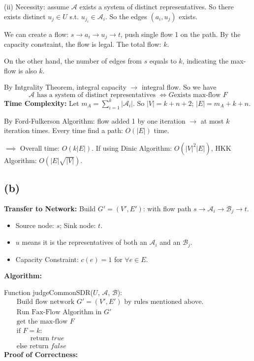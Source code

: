 \documentclass[11pt]{article}
\begin{document}
(ii) Necessity: assume $\mathcal{A}$ exists a system of distinct representatives. So there exists distinct $u_j \in U$ s.t. $u_{j_i} \in \mathcal{A}_i$. 
So the edges $(a_i, u_j)$ exists. 

We can create a flow: $s \to a_i \to u_j \to t$, push single flow 1 on the path. 
By the capacity constraint, the flow is legal. The total flow: $k$.

On the other hand, the number of edges from $s$ equals to $k$, indicating the max-flow is also $k$.

By Intgrality Theorem, integral capacity $\to$ integral flow. So we have 
\[\mathcal{A} \text{ has a system of distinct representatives } \iff G \text{exists max-flow }F \]
\textbf{Time Complexity: }
Let $m_A = \sum_{i=1}^{k} |\mathcal{A}_i|$. So $|V| = k + n + 2$; $|E| = m_A + k + n$. 

By Ford-Fulkerson Algorithm: flow added 1 by one iteration $\to$ at most $k$ iteration times.
Every time find a path: $O(|E|)$ time. 

$\implies$ Overall time: $O(k|E|)$. 
If using Dinic Algorithm: $O(|V|^2 |E|)$, HKK Algorithm: $O(|E|\sqrt{|V|})$. 

\subsection*{(b)}
\textbf{Transfer to Network: }Build $G' = (V', E')$: with flow path $s \to \mathcal{A}_i \to \mathcal{B}_j \to t$. 
\begin{itemize}
    \item Source node: $s$; Sink node: $t$. 
    \item $u$ means it is the representatives of both an $\mathcal{A}_i$ and an $\mathcal{B}_j$. 
    \item Capacity Constraint: $c(e) = 1$ for $\forall e \in E$. 
\end{itemize}
\textbf{Algorithm: }

Function judgeCommonSDR($U$, $\mathcal{A}$, $\mathcal{B}$): 
\begin{align*}
    & \text{Build flow network } G' = (V', E') \text{ by rules mentioned above}. \qquad \qquad \qquad \\
    & \text{Run Fax-Flow Algorithm in }G' \\
    & \text{get the max-flow } F \\
    & \text{if } F = k: \\
    & \qquad \text{return } true \\
    & \text{else return } false  
\end{align*}
\textbf{Proof of Correctness: }
\end{document}
